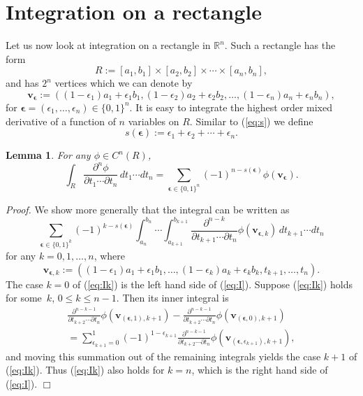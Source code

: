 \documentclass[12pt]{article}
\newcommand{\RR}{\mathbb{R}}
\def\bfv{\mathbf{v}}
\def\bfeps{{\boldsymbol \epsilon}}
\newtheorem{lemma}{Lemma}
\newenvironment{proof}{\begin{trivlist}\item[]{\emph{Proof.}}}
               {\hfill$\Box$\end{trivlist}}
\begin{document}
\section{Integration on a rectangle}

Let us now look at integration on a rectangle in $\RR^n$.
Such a rectangle has the form
$$ R := [a_1,b_1] \times [a_2,b_2] \times \cdots 
	     \times [a_n,b_n], $$
and has $2^n$ vertices which we can denote by
$$ \bfv_\bfeps := ((1-\epsilon_1)a_1 + \epsilon_1 b_1,
(1-\epsilon_2)a_2 + \epsilon_2 b_2,
\ldots, (1-\epsilon_n)a_n + \epsilon_n b_n), $$
for $\bfeps = (\epsilon_1,\ldots,\epsilon_n) \in \{0,1\}^n$.
It is easy to integrate the highest order mixed derivative
of a function of $n$ variables on $R$.
Similar to (\ref{eq:s}) we define
$$ s(\bfeps) := \epsilon_1 + \epsilon_2 + \cdots + \epsilon_n. $$
\begin{lemma}\label{lem:intrect}
For any $\phi \in C^n(R)$,
\begin{equation}\label{eq:I}
\int_R
\frac{\partial^n \phi}{\partial t_1 \cdots \partial t_n}
\, dt_1 \cdots dt_n
= \sum_{\bfeps \in \{0,1\}^n}
(-1)^{n - s(\bfeps)} \phi(\bfv_\bfeps).
\end{equation}
\end{lemma}

\begin{proof}
We show more generally that the integral can be written as
\begin{equation}\label{eq:Ik}
\sum_{\bfeps \in \{0,1\}^k}
(-1)^{k - s(\bfeps)}
\int_{a_n}^{b_n} \cdots \int_{a_{k+1}}^{b_{k+1}}
\frac{\partial^{n-k}}{\partial t_{k+1} \cdots \partial t_n}
\phi(\bfv_{\bfeps,k})
\, dt_{k+1} \cdots dt_n
\end{equation}
for any $k=0,1,\ldots,n$, where
$$ \bfv_{\bfeps,k} :=
 ((1-\epsilon_1)a_1 + \epsilon_1 b_1,
\ldots, (1-\epsilon_k)a_k + \epsilon_k b_k,
t_{k+1},\ldots,t_n). $$
The case $k=0$ of (\ref{eq:Ik}) is the left hand side of (\ref{eq:I}).
Suppose (\ref{eq:Ik}) holds for some~$k$, $0 \le k \le n-1$.
Then its inner integral is
\begin{multline*}
\frac{\partial^{n-k-1}}{\partial t_{k+2} \cdots \partial t_n}
\phi(\bfv_{(\bfeps,1),k+1})
- 
\frac{\partial^{n-k-1}}{\partial t_{k+2} \cdots \partial t_n}
\phi(\bfv_{(\bfeps,0),k+1}) \\
= \sum_{\epsilon_{k+1}=0}^1 (-1)^{1-\epsilon_{k+1}}
\frac{\partial^{n-k-1}}{\partial t_{k+2} \cdots \partial t_n}
\phi(\bfv_{(\bfeps,\epsilon_{k+1}),k+1}),
\end{multline*}
and moving this summation out of the remaining integrals
yields the case $k+1$ of (\ref{eq:Ik}).
Thus (\ref{eq:Ik}) also holds for $k=n$, which
is the right hand side of (\ref{eq:I}).
\end{proof}
\end{document}
